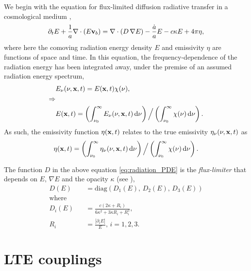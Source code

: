 \documentclass[letterpaper,10pt]{article}
\renewcommand{\(}{\left(}
\renewcommand{\)}{\right)}
\newcommand{\vb}{{\bf v}_b}
\newcommand{\xvec}{{\bf x}}
\begin{document}
We begin with the equation for flux-limited diffusion radiative
transfer in a cosmological medium \cite{ReynoldsHayesPaschosNorman2009},
\begin{equation}
\label{eq:radiation_PDE}
  \partial_{t} E + \frac1a \nabla\cdot\(E\vb\) =
    \nabla\cdot\(D\,\nabla E\) - \frac{\dot{a}}{a} E - c\kappa E + 4\pi\eta,
\end{equation}
where here the comoving radiation energy density $E$ and emissivity
$\eta$ are functions of space and time.  In this equation, the
frequency-dependence of the radiation energy has been integrated away,
under the premise of an assumed radiation energy spectrum,
\begin{align}
\label{eq:spectrum}
  & E_{\nu}(\nu,\xvec,t) = E(\xvec,t) \chi(\nu), \\
  \Rightarrow & \\
  & E(\xvec,t) = \(\int_{\nu_0}^{\infty} E_{\nu}(\nu,\xvec,t)\,\mathrm{d}\nu \)
    \Big/ \( \int_{\nu_0}^{\infty} \chi(\nu)\,\mathrm{d}\nu \).
\end{align}
As such, the emissivity function $\eta(\xvec,t)$
relates to the true emissivity $\eta_{\nu}(\nu,\xvec,t)$ as
\begin{equation}
\label{eq:emissivity}
  \eta(\xvec,t) = \( \int_{\nu_0}^{\infty}\eta_{\nu}(\nu,\xvec,t)\,\mathrm{d}\nu \) 
  \Big/ \( \int_{\nu_0}^{\infty}\chi(\nu)\,\mathrm{d}\nu \).
\end{equation}

The function $D$ in the above equation \eqref{eq:radiation_PDE} is
the {\em flux-limiter} that depends on $E$, $\nabla E$ and the 
opacity $\kappa$ (see
\cite{HayesNorman2003,ReynoldsHayesPaschosNorman2009}),  
\begin{equation}
\label{eq:limiter}
\begin{split}
   D(E) &= \text{diag}\( D_1(E),\, D_2(E),\, D_3(E) \) \\
   \text{where}\qquad & \\
   D_i(E) &= \frac{c(2\kappa+R_i)}{6\kappa^2+3\kappa R_i+R_i^2}, \\
   R_i &= \frac{|\partial_i E|}{E},\, i=1,2,3.
\end{split}
\end{equation}


\section{LTE couplings}
\label{sec:lte_model}
\end{document}
